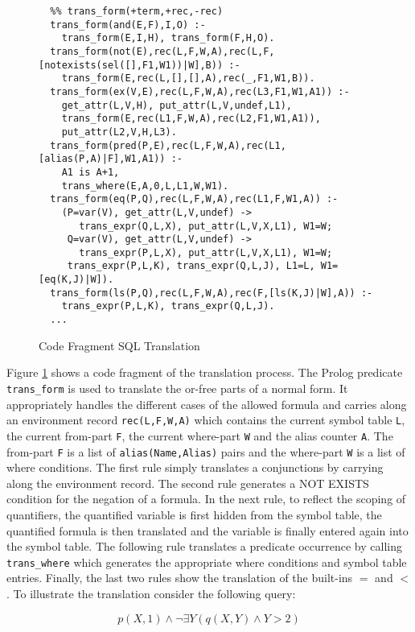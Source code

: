 \begin{figure}
{\small
\begin{verbatim}
  %% trans_form(+term,+rec,-rec)
  trans_form(and(E,F),I,O) :-
    trans_form(E,I,H), trans_form(F,H,O).
  trans_form(not(E),rec(L,F,W,A),rec(L,F,[notexists(sel([],F1,W1))|W],B)) :-
    trans_form(E,rec(L,[],[],A),rec(_,F1,W1,B)).
  trans_form(ex(V,E),rec(L,F,W,A),rec(L3,F1,W1,A1)) :-
    get_attr(L,V,H), put_attr(L,V,undef,L1), 
    trans_form(E,rec(L1,F,W,A),rec(L2,F1,W1,A1)),
    put_attr(L2,V,H,L3).    
  trans_form(pred(P,E),rec(L,F,W,A),rec(L1,[alias(P,A)|F],W1,A1)) :-
    A1 is A+1,                     
    trans_where(E,A,0,L,L1,W,W1).
  trans_form(eq(P,Q),rec(L,F,W,A),rec(L1,F,W1,A)) :-
    (P=var(V), get_attr(L,V,undef) -> 
       trans_expr(Q,L,X), put_attr(L,V,X,L1), W1=W;
     Q=var(V), get_attr(L,V,undef) -> 
       trans_expr(P,L,X), put_attr(L,V,X,L1), W1=W;
     trans_expr(P,L,K), trans_expr(Q,L,J), L1=L, W1=[eq(K,J)|W]).
  trans_form(ls(P,Q),rec(L,F,W,A),rec(F,[ls(K,J)|W],A)) :-
    trans_expr(P,L,K), trans_expr(Q,L,J).
  ...
\end{verbatim}
}
\label{transsql}
\caption{Code Fragment SQL Translation}
\end{figure}

Figure \ref{transsql} shows a code fragment of the translation process. The Prolog predicate
\verb.trans_form. is used to translate the or-free parts of a normal form. It appropriately
handles the different cases of the allowed formula and carries along an environment record
\verb.rec(L,F,W,A). which contains the current symbol table \verb.L., the current from-part 
\verb.F., the current where-part \verb.W. and the alias counter \verb.A.. The from-part 
\verb.F. is a list of \verb.alias(Name,Alias). pairs and the where-part \verb.W. is
a list of where conditions. The first rule simply translates a conjunctions by carrying along
the environment record. The second rule generates a NOT EXISTS condition for the
negation of a formula. In the next rule, to reflect the scoping of quantifiers, the 
quantified variable is first hidden from the symbol table, the quantified formula is then 
translated and the variable is finally entered again into the symbol table. The following rule
translates a predicate occurrence by calling \verb.trans_where. which generates the appropriate 
where conditions and symbol table entries. Finally, the last two rules show the translation of 
the built-ins $=$ and $<$. To illustrate the translation consider the following query: 

\begin{displaymath}
p(X,1) \wedge \neg \exists Y(q(X,Y) \wedge Y>2)
\end{displaymath}

